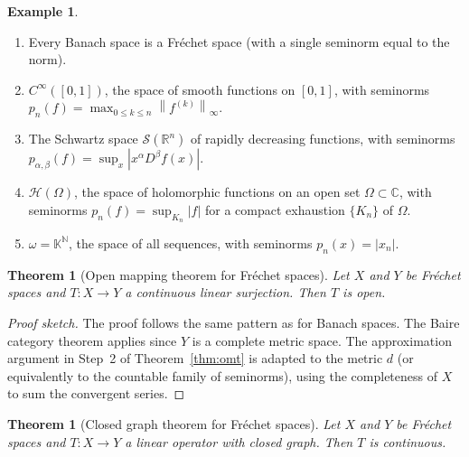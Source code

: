 \documentclass[a4paper,12pt]{book}
\newcommand{\N}{\mathbb{N}}
\newcommand{\R}{\mathbb{R}}
\newcommand{\C}{\mathbb{C}}
\newcommand{\K}{\mathbb{K}}
\newcommand{\norm}[1]{\left\| #1 \right\|}
\newcommand{\abs}[1]{\left| #1 \right|}
\theoremstyle{definition}
\newtheorem{example}[definition]{Example}
\theoremstyle{plain}
\newtheorem{theorem}[definition]{Theorem}
\theoremstyle{remark}
\begin{document}
\begin{example}\label{ex:frechet-examples}
\begin{enumerate}[label=(\roman*)]
  \item Every Banach space is a Fr\'echet space (with a single seminorm equal to
    the norm).
  \item $C^\infty([0,1])$, the space of smooth functions
    on $[0,1]$, with seminorms $p_n(f) = \max_{0 \leq k \leq n} \norm{f^{(k)}}_\infty$.
  \item The Schwartz space $\mathcal{S}(\R^n)$ of rapidly
    decreasing functions, with seminorms
    $p_{\alpha,\beta}(f) = \sup_{x} \abs{x^\alpha D^\beta f(x)}$.
  \item $\mathcal{H}(\Omega)$, the space of holomorphic
    functions on an open set $\Omega \subset \C$, with seminorms
    $p_n(f) = \sup_{K_n} \abs{f}$ for a compact exhaustion $\{K_n\}$ of $\Omega$.
  \item $\omega = \K^{\N}$, the space of all
    sequences, with seminorms $p_n(x) = \abs{x_n}$.
\end{enumerate}
\end{example}

\begin{theorem}[Open mapping theorem for Fr\'echet spaces]%
\label{thm:omt-frechet}
Let $X$ and $Y$ be Fr\'echet spaces and $T \colon X \to Y$ a continuous linear
surjection. Then $T$ is open.
\end{theorem}

\begin{proof}[Proof sketch]
The proof follows the same pattern as for Banach spaces. The Baire category theorem
applies since $Y$ is a complete metric space. The approximation argument in Step~2
of Theorem~\ref{thm:omt} is adapted to the metric $d$ (or equivalently to the
countable family of seminorms), using the completeness of $X$ to sum the convergent
series.
\end{proof}

\begin{theorem}[Closed graph theorem for Fr\'echet spaces]%
\label{thm:cgt-frechet}
Let $X$ and $Y$ be Fr\'echet spaces and $T \colon X \to Y$ a linear operator with
closed graph. Then $T$ is continuous.
\end{theorem}
\end{document}
